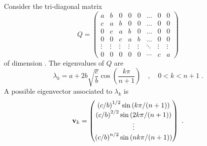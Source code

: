 \begin{prop}
Consider the tri-diagonal matrix
\[
Q = \begin{pmatrix}
a & b & 0 & 0 & 0 & \ldots & 0 & 0 \\
c & a & b & 0 & 0 & \ldots & 0 & 0  \\
0 & c & a & b & 0 & \ldots & 0 & 0 \\
0 & 0 & c & a & b & \ldots & 0 & 0 \\
\vdots & \vdots & \vdots & \vdots & \vdots & \ddots & \vdots & \vdots \\
0 & 0 & 0 & 0 & 0 & \cdots & c & a
\end{pmatrix}
\]
of dimension \nn.  The eigenvalues of $Q$ are
\[
\lambda_k = a + 2 b \sqrt{\frac{c}{b}} \cos\left(\frac{k\pi}{n+1}\right)
\quad , \quad 0 < k < n+1 \; .
\]
A possible eigenvector associated to $\lambda_k$ is
\[
\mathbf{v}_k =
\begin{pmatrix}
\left(c/b\right)^{1/2} \sin\left(k\pi/(n+1)\right) \\
\left(c/b\right)^{2/2} \sin\left(2k\pi/(n+1)\right) \\
\vdots \\
\left(c/b\right)^{n/2} \sin\left(nk\pi/(n+1)\right)
\end{pmatrix} \ .
\]
\label{fdm_eigR}
\end{prop}

